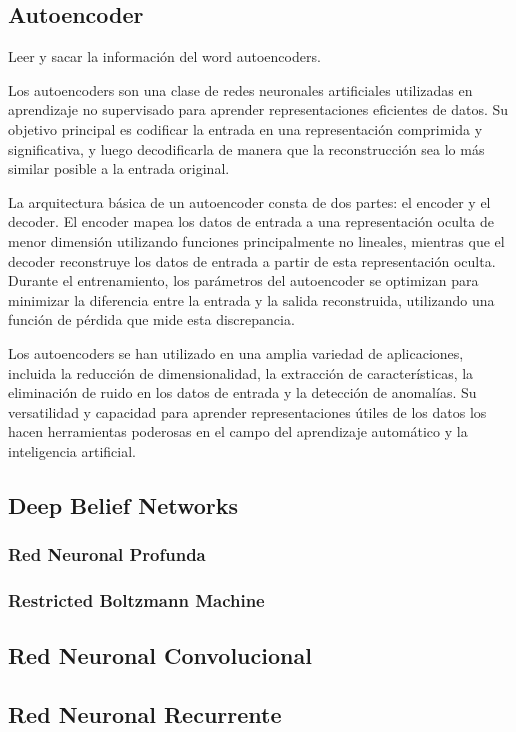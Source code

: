 \documentclass[12pt,a4paper]{book}
\begin{document}
\subsection{Autoencoder}

Leer y sacar la información del word autoencoders.

Los autoencoders son una clase de redes neuronales artificiales utilizadas en aprendizaje no supervisado para aprender representaciones eficientes de datos. Su objetivo principal es codificar la entrada en una representación comprimida y significativa, y luego decodificarla de manera que la reconstrucción sea lo más similar posible a la entrada original.

La arquitectura básica de un autoencoder consta de dos partes: el encoder y el decoder. El encoder mapea los datos de entrada a una representación oculta de menor dimensión utilizando funciones principalmente no lineales, mientras que el decoder reconstruye los datos de entrada a partir de esta representación oculta. Durante el entrenamiento, los parámetros del autoencoder se optimizan para minimizar la diferencia entre la entrada y la salida reconstruida, utilizando una función de pérdida que mide esta discrepancia.

Los autoencoders se han utilizado en una amplia variedad de aplicaciones, incluida la reducción de dimensionalidad, la extracción de características, la eliminación de ruido en los datos de entrada y la detección de anomalías. Su versatilidad y capacidad para aprender representaciones útiles de los datos los hacen herramientas poderosas en el campo del aprendizaje automático y la inteligencia artificial.



\subsection{Deep Belief Networks}
\subsubsection{Red Neuronal Profunda}
\subsubsection{Restricted Boltzmann Machine}
\subsection{Red Neuronal Convolucional}
\subsection{Red Neuronal Recurrente}
\end{document}
